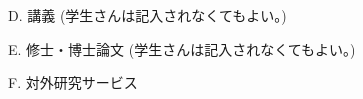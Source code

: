 \documentclass[a4j,twocolumn]{jarticle}
\begin{document}
\vspace{0.2cm}
\noindent
D. 講義 (学生さんは記入されなくてもよい。)

\vspace{0.1cm}



\vspace{0.2cm}




\noindent
E. 修士・博士論文 (学生さんは記入されなくてもよい。)

\vspace{0.1cm}



\vspace{0.2cm}
\noindent
F. 対外研究サービス

\vspace{0.1cm}
\end{document}

